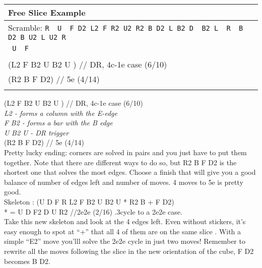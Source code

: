 \documentclass[11pt,a4paper]{book}
\newcommand{\p}{\textquotesingle}
\newcommand{\m}{\texttt}
\newcommand{\ps}{\p\,\,}
\newcommand{\comment}[1]{{\color{gray}\quad//#1}}
\begin{document}
\bigskip
\begin{tabular}{|l|}
\hline
\textbf{Free Slice Example}\\
\hline
Scramble: \m{R\ps U\ps F D2 L2 F R2 U2 R2 B D2 L B2 D\ps B2 L\ps R\ps B D2 B U2 L U2 R\ps}\\ \m{ U\ps F }\\
\hline
\begin{minipage}[l]{0.650\textwidth}
\bigskip
\m{(U D\ps F R) \comment{ EO (4/4)}\\
(L2 F\ps B2 U\ps B2 U\ps ) \comment{ DR, 4c-1e case (6/10)}\\
(R2 B F D2) \comment{ 5e (4/14)}\\
}
\bigskip
\end{minipage}
\begin{minipage}[c]{0.25\textwidth}
\centering
\def\svgwidth{\columnwidth}

\end{minipage}\\
\hline
\end{tabular}
\bigskip
\newline
(L2 F\ps B2 U\ps B2 U\ps ) \comment{ DR, 4c-1e case (6/10)}\\
\textit{ L2 - forms a column with the E-edge\\
F\ps B2 - forms a bar with the B edge\\
U\ps B2 U\ps - DR trigger}\\
\newline
(R2 B F D2) \comment{ 5e (4/14)}\\
Pretty lucky ending: corners are solved in pairs and you just have to put them together. Note that there are different ways to do so, but R2 B F D2 is the shortest one that solves the most edges. Choose a finish that will give you a good balance of number of edges left and number of moves. 4 moves to 5e is pretty good.\\
\newline
Skeleton : (U D\ps F R L2 F\ps B2 U\ps B2 U\ps * R2 B + F D2) \\
* = U D\ps F2 D U\ps R2 \comment{2e2e (2/16) .3cycle to a 2e2e case. }\\
\newline
Take this new skeleton and look at the 4 edges left. Even without stickers, it's easy enough to spot at “+” that all 4 of them are on the same slice . With a simple “E2” move you'lll solve the 2e2e cycle in just two moves! Remember to rewrite all the moves following the slice in the new orientation of the cube, F D2 becomes B D2.\\
\end{document}
